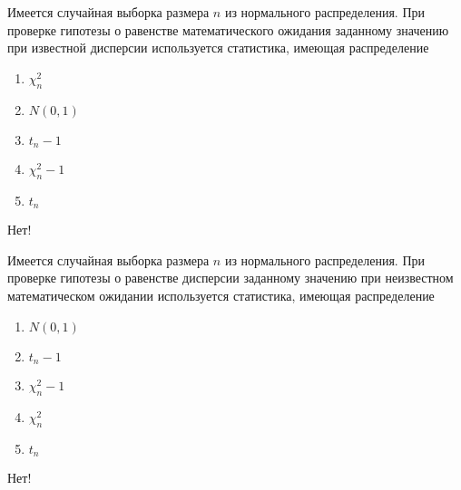 \documentclass[t]{beamer}
\begin{document}
 \begin{frame} \label{10-No} 
\begin{block}{10} 

Имеется случайная выборка размера $n$ из нормального распределения. При проверке гипотезы о равенстве математического ожидания заданному значению при известной дисперсии используется статистика, имеющая распределение
 


 \end{block} 
\begin{enumerate} 
\item[] \hyperlink{10-No}{\beamergotobutton{} $\chi^2_n$}
\item[] \hyperlink{10-Yes}{\beamergotobutton{} $N(0,1)$}
\item[] \hyperlink{10-No}{\beamergotobutton{} $t_n-1$}
\item[] \hyperlink{10-No}{\beamergotobutton{} $\chi^2_n-1$}
\item[] \hyperlink{10-No}{\beamergotobutton{} $t_n$}
\end{enumerate} 

 \alert{Нет!} 
\end{frame} 


 \begin{frame} \label{11-No} 
\begin{block}{11} 

Имеется случайная выборка размера $n$ из нормального распределения. При проверке гипотезы о равенстве дисперсии заданному значению при неизвестном математическом ожидании используется статистика, имеющая распределение
 


 \end{block} 
\begin{enumerate} 
\item[] \hyperlink{11-No}{\beamergotobutton{} $N(0,1)$}
\item[] \hyperlink{11-No}{\beamergotobutton{} $t_n-1$}
\item[] \hyperlink{11-Yes}{\beamergotobutton{} $\chi^2_n-1$}
\item[] \hyperlink{11-No}{\beamergotobutton{} $\chi^2_n$}
\item[] \hyperlink{11-No}{\beamergotobutton{} $t_n$}
\end{enumerate} 

 \alert{Нет!} 
\end{frame} 
\end{document}
